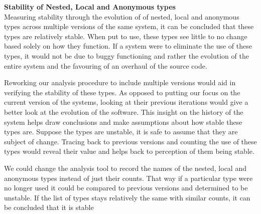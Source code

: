 \documentclass{assignment}
\begin{document}
\begin{enumerate}
\textbf{Stability of Nested, Local and Anonymous types }\\

Measuring stability through the evolution of of nested, local and anonymous types across multiple versions of the same system, it can be concluded that these types are relatively stable. When put to use, these types see little to no change based solely on how they function. If a system were to eliminate the use of these types, it would not be due to buggy functioning and rather the evolution of the entire system and the favouring of an overhaul of the source code. 

	Reworking our analysis procedure to include multiple versions would aid in verifying the stability of these types. As opposed to putting our focus on the current version of the systems, looking at their previous iterations would give a better look at the evolution of the software. This insight on the history of the system helps draw conclusions and make assumptions about how stable these types are. Suppose the types are unstable, it is safe to assume that they are subject of change. Tracing back to previous versions and counting the use of these types would reveal their value and helps back to perception of them being stable.

We could change the analysis tool to record the names of the nested, local and anonymous types instead of just their counts. That way if a particular type were no longer used it could be compared to previous versions and determined to be unstable. If the list of types stays relatively the same with similar counts, it can be concluded that it is stable

\end{enumerate}
\end{document}
